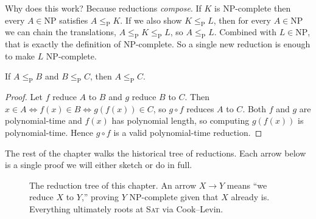 Why does this work? Because reductions \emph{compose}. If $K$ is NP-complete then
every $A\in\mathrm{NP}$ satisfies $A\le_{\mathrm{P}}K$. If we also show
$K\le_{\mathrm{P}}L$, then for every $A\in\mathrm{NP}$ we can chain the translations,
$A\le_{\mathrm{P}}K\le_{\mathrm{P}}L$, so $A\le_{\mathrm{P}}L$. Combined with
$L\in\mathrm{NP}$, that is exactly the definition of NP-complete. So a single new
reduction is enough to make $L$ NP-complete.

\begin{lemma}
\label{ch33:compose}
If $A\le_{\mathrm P}B$ and $B\le_{\mathrm P}C$, then $A\le_{\mathrm P}C$.
\end{lemma}
\begin{proof}
Let $f$ reduce $A$ to $B$ and $g$ reduce $B$ to $C$. Then $x\in A \iff f(x)\in B
\iff g(f(x))\in C$, so $g\circ f$ reduces $A$ to $C$. Both $f$ and $g$ are
polynomial-time and $f(x)$ has polynomial length, so computing $g(f(x))$ is
polynomial-time. Hence $g\circ f$ is a valid polynomial-time reduction.
\end{proof}

The rest of the chapter walks the historical tree of reductions. Each arrow below
is a single proof we will either sketch or do in full.

\begin{figure}[h]
\centering
{}
\caption{The reduction tree of this chapter. An arrow $X\to Y$ means ``we reduce
$X$ to $Y$,'' proving $Y$ NP-complete given that $X$ already is. Everything
ultimately roots at \textsc{Sat} via Cook--Levin.}
\label{ch33:reduction-tree}
\end{figure}

